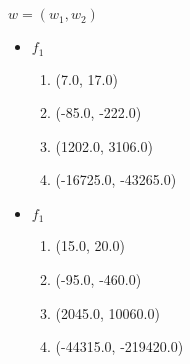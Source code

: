 \documentclass[12pt]{article}
\begin{document}
\section{}
$ w = (w_1, w_2) $
\begin{itemize}
	\item $ f_1 $
	\begin{enumerate}
		\item (7.0, 17.0)
		\item (-85.0, -222.0)
		\item (1202.0, 3106.0)
		\item (-16725.0, -43265.0)
	\end{enumerate}

	\item $ f_1 $
	\begin{enumerate}
		\item (15.0, 20.0)
		\item (-95.0, -460.0)
		\item (2045.0, 10060.0)
		\item (-44315.0, -219420.0)
	\end{enumerate} 
\end{itemize}
\end{document}
